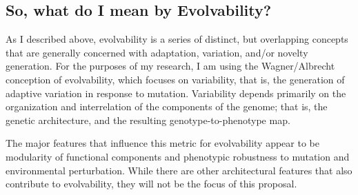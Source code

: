 \subsection{So, what do I mean by Evolvability?}

As I described above, evolvability is a series of distinct, but overlapping concepts that are generally concerned with adaptation, variation, and/or novelty generation. For the purposes of my research, I am using the Wagner/Albrecht conception of evolvability, which focuses on variability, that is, the generation of adaptive variation in response to mutation. Variability depends primarily on the organization and interrelation of the components of the genome; that is, the genetic architecture, and the resulting genotype-to-phenotype map.

The major features that influence this metric for evolvability appear to be modularity of functional components and phenotypic robustness to mutation and environmental perturbation. While there are other architectural features that also contribute to evolvability, they will not be the focus of this proposal.

